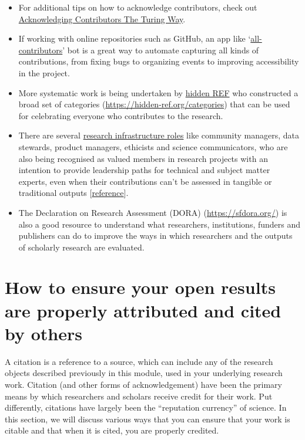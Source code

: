 \documentclass[
  letterpaper,
  DIV=11,
  numbers=noendperiod]{scrreport}
\begin{document}
\begin{itemize}
\item
  For additional tips on how to acknowledge contributors, check out
  \href{https://the-turing-way.netlify.app/community-handbook/acknowledgement.html}{Acknowledging
  Contributors The Turing Way}.
\item
  If working with online repositories such as GitHub, an app like
  `\href{https://allcontributors.org/}{all-contributors}' bot is a great
  way to automate capturing all kinds of contributions, from fixing bugs
  to organizing events to improving accessibility in the project.
\item
  More systematic work is being undertaken by
  \href{https://hidden-ref.org/}{hidden REF} who constructed a broad set
  of categories
  (\href{https://hidden-ref.org/categories/}{https://hidden-ref.org/categories})
  that can be used for celebrating everyone who contributes to the
  research.
\item
  There are several
  \href{https://the-turing-way.netlify.app/collaboration/research-infrastructure-roles.html}{research
  infrastructure roles} like community managers, data stewards, product
  managers, ethicists and science communicators, who are also being
  recognised as valued members in research projects with an intention to
  provide leadership paths for technical and subject matter experts,
  even when their contributions can't be assessed in tangible or
  traditional outputs
  {[}\href{https://the-turing-way.netlify.app/collaboration/research-infrastructure-roles.html}{reference}{]}.
\item
  The Declaration on Research Assessment (DORA)
  (\url{https://sfdora.org/}) is also a good resource to understand what
  researchers, institutions, funders and publishers can do to improve
  the ways in which researchers and the outputs of scholarly research
  are evaluated.
\end{itemize}

\hypertarget{how-to-ensure-your-open-results-are-properly-attributed-and-cited-by-others}{%
\section{How to ensure your open results are properly attributed and
cited by
others}\label{how-to-ensure-your-open-results-are-properly-attributed-and-cited-by-others}}

A citation is a reference to a source, which can include any of the
research objects described previously in this module, used in your
underlying research work. Citation (and other forms of acknowledgement)
have been the primary means by which researchers and scholars receive
credit for their work. Put differently, citations have largely been the
``reputation currency'' of science. In this section, we will discuss
various ways that you can ensure that your work is citable and that when
it is cited, you are properly credited.
\end{document}
